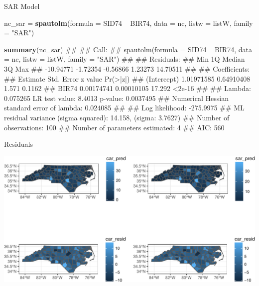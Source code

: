 \documentclass[11pt,ignorenonframetext,]{beamer}
\newenvironment{Shaded}{}{}
\newcommand{\KeywordTok}[1]{\textcolor[rgb]{0.00,0.44,0.13}{\textbf{#1}}}
\newcommand{\DataTypeTok}[1]{\textcolor[rgb]{0.56,0.13,0.00}{#1}}
\newcommand{\StringTok}[1]{\textcolor[rgb]{0.25,0.44,0.63}{#1}}
\newcommand{\OperatorTok}[1]{\textcolor[rgb]{0.40,0.40,0.40}{#1}}
\newcommand{\NormalTok}[1]{#1}
\let\oldShaded\Shaded
\let\endoldShaded\endShaded
\renewenvironment{Shaded}{\footnotesize\begin{spacing}{0.9}\oldShaded}{\endoldShaded\end{spacing}}
\let\oldverbatim\verbatim
\let\endoldverbatim\endverbatim
\newcommand{\scriptoutput}{
  \renewenvironment{Shaded}{\scriptsize\begin{spacing}{0.9}\oldShaded}{\endoldShaded\end{spacing}}
  \renewenvironment{verbatim}{\scriptsize\begin{spacing}{0.9}\oldverbatim}{\endoldverbatim\end{spacing}}
}
\begin{document}
\begin{frame}[fragile,t]{SAR Model}

\scriptoutput

\begin{Shaded}
\begin{Highlighting}[]
\NormalTok{nc_sar =}\StringTok{ }\KeywordTok{spautolm}\NormalTok{(}\DataTypeTok{formula =}\NormalTok{ SID74 }\OperatorTok{~}\StringTok{ }\NormalTok{BIR74, }\DataTypeTok{data =}\NormalTok{ nc, }
                  \DataTypeTok{listw =}\NormalTok{ listW, }\DataTypeTok{family =} \StringTok{"SAR"}\NormalTok{)}

\KeywordTok{summary}\NormalTok{(nc_sar)}
\NormalTok{## }
\NormalTok{## Call: }
\NormalTok{## spautolm(formula = SID74 ~ BIR74, data = nc, listw = listW, family = "SAR")}
\NormalTok{## }
\NormalTok{## Residuals:}
\NormalTok{##       Min        1Q    Median        3Q       Max }
\NormalTok{## -10.94771  -1.72354  -0.56866   1.23273  14.70511 }
\NormalTok{## }
\NormalTok{## Coefficients: }
\NormalTok{##               Estimate Std. Error z value Pr(>|z|)}
\NormalTok{## (Intercept) 1.01971585 0.64910408   1.571   0.1162}
\NormalTok{## BIR74       0.00174741 0.00010105  17.292   <2e-16}
\NormalTok{## }
\NormalTok{## Lambda: 0.075265 LR test value: 8.4013 p-value: 0.0037495 }
\NormalTok{## Numerical Hessian standard error of lambda: 0.024085 }
\NormalTok{## }
\NormalTok{## Log likelihood: -275.9975 }
\NormalTok{## ML residual variance (sigma squared): 14.158, (sigma: 3.7627)}
\NormalTok{## Number of observations: 100 }
\NormalTok{## Number of parameters estimated: 4 }
\NormalTok{## AIC: 560}
\end{Highlighting}
\end{Shaded}

\end{frame}

\begin{frame}{Residuals}

\includegraphics{Lec19_files/figure-beamer/unnamed-chunk-9-1.pdf}

\end{frame}
\end{document}
